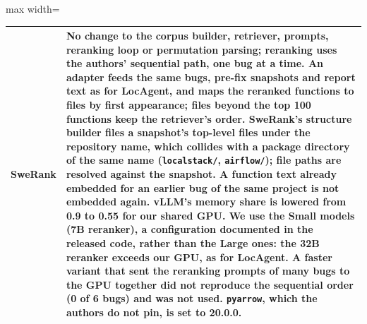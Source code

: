 \begin{table}[t]
\begin{adjustbox}{max width=\linewidth}
\begin{tabular}{p{1.8cm}p{14.3cm}}
SweRank & No change to the corpus builder, retriever, prompts, reranking loop or permutation parsing; reranking uses the authors' sequential path, one bug at a time. An adapter feeds the same bugs, pre-fix snapshots and report text as for LocAgent, and maps the reranked functions to files by first appearance; files beyond the top 100 functions keep the retriever's order. SweRank's structure builder files a snapshot's top-level files under the repository name, which collides with a package directory of the same name (\texttt{localstack/}, \texttt{airflow/}); file paths are resolved against the snapshot. A function text already embedded for an earlier bug of the same project is not embedded again. vLLM's memory share is lowered from 0.9 to 0.55 for our shared GPU. We use the Small models (7B reranker), a configuration documented in the released code, rather than the Large ones: the 32B reranker exceeds our GPU, as for LocAgent. A faster variant that sent the reranking prompts of many bugs to the GPU together did not reproduce the sequential order (0 of 6 bugs) and was not used. \texttt{pyarrow}, which the authors do not pin, is set to 20.0.0. \\
\bottomrule
\end{tabular}\end{adjustbox}
\end{table}
